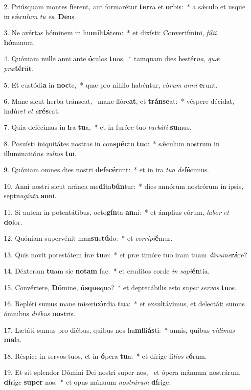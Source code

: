 2. Priúsquam montes fíerent, aut formarétur \textbf{ter}ra et \textbf{or}bis:~*  a sǽculo et usque in sǽcu\textit{lum} \textit{tu} \textit{es}, \textbf{De}us.\

3. Ne avértas hóminem in hu\textbf{mi}li\textbf{tá}tem:~*  et dixísti: Convertímini, \textit{fí}\textit{li}\textit{i} \textbf{hó}minum.\

4. Quóniam mille anni ante \textbf{ó}culos \textbf{tu}os,~*  tamquam dies hestér\textit{na}, \textit{quæ} \textit{præ}\textbf{tér}iit.\

5. Et custódi\textbf{a} in \textbf{noc}te,~*  quæ pro níhilo habéntur, eó\textit{rum} \textit{an}\textit{ni} \textbf{e}runt.\

6. Mane sicut herba tránseat, \dag\  mane flóre\textbf{at}, et \textbf{tráns}\textbf{e}at:~*  véspere décidat, indú\textit{ret} \textit{et} \textit{a}\textbf{rés}cat.\

7. Quia defécimus in \textbf{i}ra \textbf{tu}a,~*  et in furóre tuo \textit{tur}\textit{bá}\textit{ti} \textbf{su}mus.\

8. Posuísti iniquitátes nostras in con\textbf{spéc}tu \textbf{tu}o:~*  sǽculum nostrum in illuminatió\textit{ne} \textit{vul}\textit{tus} \textbf{tu}i.\

9. Quóniam omnes dies nostri \textbf{de}fe\textbf{cé}runt:~*  et in ira \textit{tu}\textit{a} \textit{de}\textbf{fé}cimus.\

10. Anni nostri sicut aránea me\textbf{di}ta\textbf{bún}tur:~*  dies annórum nostrórum in ipsis, septu\textit{a}\textit{gín}\textit{ta} \textbf{an}ni.\

11. Si autem in potentátibus, octo\textbf{gín}ta \textbf{an}ni:~*  et ámplius eórum, \textit{la}\textit{bor} \textit{et} \textbf{do}lor.\

12. Quóniam supervénit man\textbf{su}e\textbf{tú}do:~*  et \textit{cor}\textit{ri}\textit{pi}\textbf{é}mur.\

13. Quis novit potestátem \textbf{i}ræ \textbf{tu}æ:~*  et præ timóre tuo iram tuam \textit{di}\textit{nu}\textit{me}\textbf{rá}re?\

14. Déxteram \textbf{tu}am sic \textbf{no}\textbf{tam} fac:~*  et erudítos corde \textit{in} \textit{sa}\textit{pi}\textbf{én}tia.\

15. Convértere, \textbf{Dó}mine, \textbf{ús}\textbf{que}quo?~*  et deprecábilis esto su\textit{per} \textit{ser}\textit{vos} \textbf{tu}os.\

16. Repléti sumus mane miseri\textbf{cór}dia \textbf{tu}a:~*  et exsultávimus, et delectáti sumus ómnibus \textit{di}\textit{é}\textit{bus} \textbf{nos}tris.\

17. Lætáti sumus pro diébus, quibus nos hu\textbf{mi}li\textbf{ás}ti:~*  annis, quibus \textit{ví}\textit{di}\textit{mus} \textbf{ma}la.\

18. Réspice in servos tuos, et in \textbf{ó}pera \textbf{tu}a:~*  et dírige fí\textit{li}\textit{os} \textit{e}\textbf{ó}rum.\

19. Et sit splendor Dómini Dei nostri super nos, \dag\  et ópera mánuum nostrárum \textbf{dí}rige \textbf{su}\textbf{per} nos:~*  et opus mánuum \textit{nos}\textit{trá}\textit{rum} \textbf{dí}rige.\

